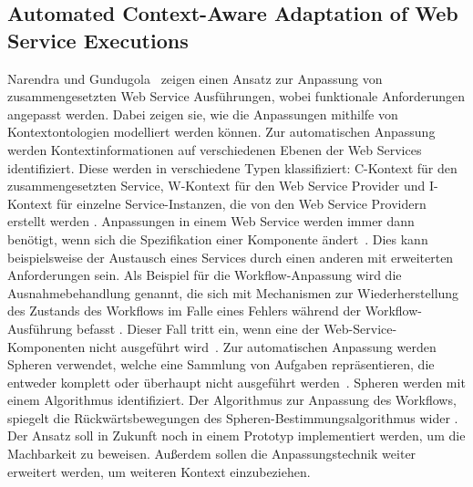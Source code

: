 \documentclass[conference,compsoc]{IEEEtran}
\begin{document}
\subsection{Automated Context-Aware Adaptation of Web Service Executions}
Narendra und Gundugola~\cite{narendra2006automated} zeigen einen Ansatz zur Anpassung von zusammengesetzten Web Service Ausführungen, wobei funktionale Anforderungen angepasst werden. Dabei zeigen sie, wie die Anpassungen mithilfe von Kontextontologien modelliert werden können. Zur automatischen Anpassung werden Kontextinformationen auf verschiedenen Ebenen der Web Services identifiziert. Diese werden in verschiedene Typen klassifiziert: C-Kontext für den zusammengesetzten Service, W-Kontext für den Web Service Provider und I-Kontext für einzelne Service-Instanzen, die von den Web Service Providern erstellt werden \cite{narendra2006automated}. Anpassungen in einem Web Service werden immer dann benötigt, wenn sich die Spezifikation einer Komponente ändert~\cite{narendra2006automated}. Dies kann beispielsweise der Austausch eines Services durch einen anderen mit erweiterten Anforderungen sein.
Als Beispiel für die Workflow-Anpassung wird die Ausnahmebehandlung genannt, die sich mit Mechanismen zur Wiederherstellung des Zustands des Workflows im Falle eines Fehlers während der Workflow-Ausführung befasst \cite{narendra2006automated}. Dieser Fall tritt ein, wenn eine der Web-Service-Komponenten nicht ausgeführt wird~\cite{narendra2006automated}.
Zur automatischen Anpassung werden Spheren verwendet, welche eine Sammlung von Aufgaben repräsentieren, die entweder komplett oder überhaupt nicht ausgeführt werden~\cite{narendra2006automated}. Spheren werden mit einem Algorithmus identifiziert. Der Algorithmus zur Anpassung des Workflows, spiegelt die Rückwärtsbewegungen des Spheren-Bestimmungsalgorithmus wider \cite{narendra2006automated}.
Der Ansatz soll in Zukunft noch in einem Prototyp implementiert werden, um die Machbarkeit zu beweisen. Außerdem sollen die Anpassungstechnik weiter erweitert werden, um weiteren Kontext einzubeziehen.
\end{document}
